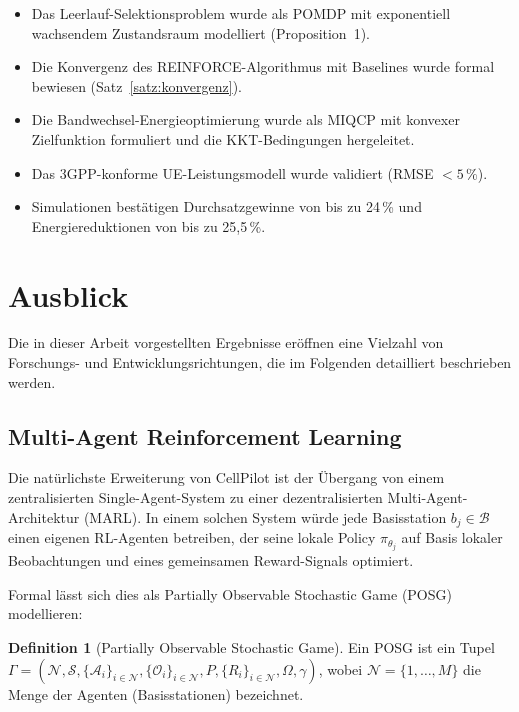 ﻿\documentclass[a4paper,12pt]{article}
\theoremstyle{definition}
\newtheorem{definition}{Definition}
\begin{document}
\begin{itemize}
  \item Das Leerlauf-Selektionsproblem wurde als POMDP mit exponentiell wachsendem
    Zustandsraum modelliert (Proposition~1).
  \item Die Konvergenz des REINFORCE-Algorithmus mit Baselines wurde formal bewiesen
    (Satz~\ref{satz:konvergenz}).
  \item Die Bandwechsel-Energieoptimierung wurde als MIQCP mit konvexer Zielfunktion
    formuliert und die KKT-Bedingungen hergeleitet.
  \item Das 3GPP-konforme UE-Leistungsmodell wurde validiert (RMSE $< 5\,\%$).
  \item Simulationen best\"atigen Durchsatzgewinne von bis zu 24\,\% und
    Energiereduktionen von bis zu 25{,}5\,\%.
\end{itemize}

\section{Ausblick}
\label{sec:ausblick}

Die in dieser Arbeit vorgestellten Ergebnisse er\"offnen eine Vielzahl von
Forschungs- und Entwicklungsrichtungen, die im Folgenden detailliert beschrieben werden.

\subsection{Multi-Agent Reinforcement Learning}

Die nat\"urlichste Erweiterung von CellPilot ist der \"Ubergang von einem
zentralisierten Single-Agent-System zu einer dezentralisierten Multi-Agent-Architektur (MARL).
In einem solchen System w\"urde jede Basisstation $b_j \in \mathcal{B}$ einen eigenen RL-Agenten
betreiben, der seine lokale Policy $\pi_{\theta_j}$ auf Basis lokaler Beobachtungen und
eines gemeinsamen Reward-Signals optimiert.

Formal lässt sich dies als Partially Observable Stochastic Game (POSG) modellieren:
\begin{definition}[Partially Observable Stochastic Game]
  Ein POSG ist ein Tupel $\Gamma = (\mathcal{N}, \mathcal{S}, \{\mathcal{A}_i\}_{i \in \mathcal{N}},
  \{\mathcal{O}_i\}_{i \in \mathcal{N}}, P, \{R_i\}_{i \in \mathcal{N}}, \Omega, \gamma)$,
  wobei $\mathcal{N} = \{1, \ldots, M\}$ die Menge der Agenten (Basisstationen) bezeichnet.
\end{definition}
\end{document}
